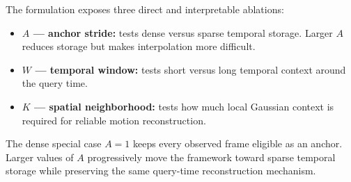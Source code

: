 \documentclass[10pt]{article}
\begin{document}
The formulation exposes three direct and interpretable ablations:
\begin{itemize}
    \item \textbf{$A$ --- anchor stride:} tests dense versus sparse temporal storage. Larger $A$ reduces storage but makes interpolation more difficult.
    \item \textbf{$W$ --- temporal window:} tests short versus long temporal context around the query time.
    \item \textbf{$K$ --- spatial neighborhood:} tests how much local Gaussian context is required for reliable motion reconstruction.
\end{itemize}

The dense special case $A=1$ keeps every observed frame eligible as an anchor. Larger values of $A$ progressively move the framework toward sparse temporal storage while preserving the same query-time reconstruction mechanism.
\end{document}

